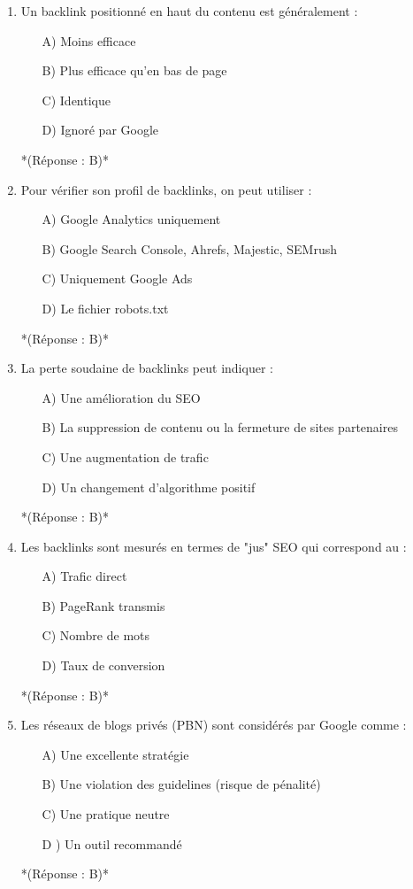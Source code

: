 \documentclass[12pt,a4paper,twoside]{report}
\begin{document}
\begin{enumerate}
\item Un backlink positionné en haut du contenu est généralement :
\begin{itemize}
\item[A)] Moins efficace
\item[B)] Plus efficace qu'en bas de page
\item[C)] Identique
\item[D)] Ignoré par Google
\end{itemize}
*(Réponse : B)*

\item Pour vérifier son profil de backlinks, on peut utiliser :
\begin{itemize}
\item[A)] Google Analytics uniquement
\item[B)] Google Search Console, Ahrefs, Majestic, SEMrush
\item[C)] Uniquement Google Ads
\item[D)] Le fichier robots.txt
\end{itemize}
*(Réponse : B)*

\item La perte soudaine de backlinks peut indiquer :
\begin{itemize}
\item[A)] Une amélioration du SEO
\item[B)] La suppression de contenu ou la fermeture de sites partenaires
\item[C)] Une augmentation de trafic
\item[D)] Un changement d'algorithme positif
\end{itemize}
*(Réponse : B)*

\item Les backlinks sont mesurés en termes de "jus" SEO qui correspond au :
\begin{itemize}
\item[A)] Trafic direct
\item[B)] PageRank transmis
\item[C)] Nombre de mots
\item[D)] Taux de conversion
\end{itemize}
*(Réponse : B)*

\item Les réseaux de blogs privés (PBN) sont considérés par Google comme :
\begin{itemize}
\item[A)] Une excellente stratégie
\item[B)] Une violation des guidelines (risque de pénalité)
\item[C)] Une pratique neutre
\item[D]) Un outil recommandé
\end{itemize}
*(Réponse : B)*


\end{enumerate}
\end{document}
